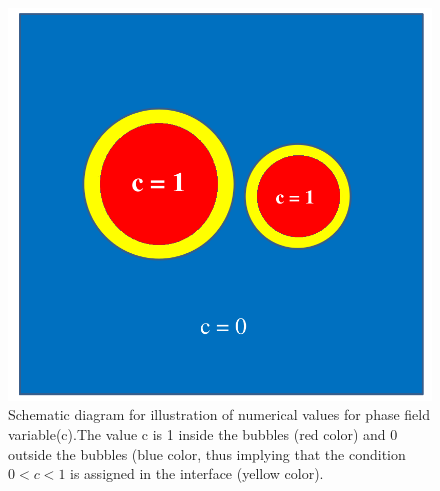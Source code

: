 \documentclass[10pt,a4paper]{article}
\begin{document}
\begin{figure}
\caption{Schematic diagram for illustration of numerical values for phase field variable(c).The value c is 1 inside the bubbles (red color) and 0 outside the bubbles (blue color, thus implying that the condition $0<c<1$ is assigned in the interface (yellow color). }
\centering
  \includegraphics[scale=0.5]{Figure3}
\end{figure}
  
\end{document}
